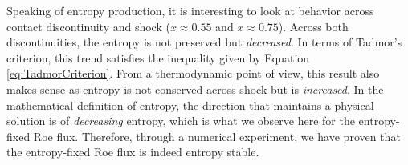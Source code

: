\documentclass[a4paper]{article}
\numberwithin{equation}{section}
\begin{document}
Speaking of entropy production, it is interesting to look at behavior across contact discontinuity and shock ($x \approx 0.55$ and $x \approx 0.75$). Across both discontinuities, the entropy is not preserved but \textit{decreased}. In terms of Tadmor's criterion, this trend satisfies the inequality given by Equation \ref{eq:TadmorCriterion}. From a thermodynamic point of view, this result also makes sense as entropy is not conserved across shock but is \textit{increased}. In the mathematical definition of entropy, the direction that maintains a physical solution is of \textit{decreasing} entropy, which is what we observe here for the entropy-fixed Roe flux. Therefore, through a numerical experiment, we have proven that the entropy-fixed Roe flux is indeed entropy stable.

\end{document}
